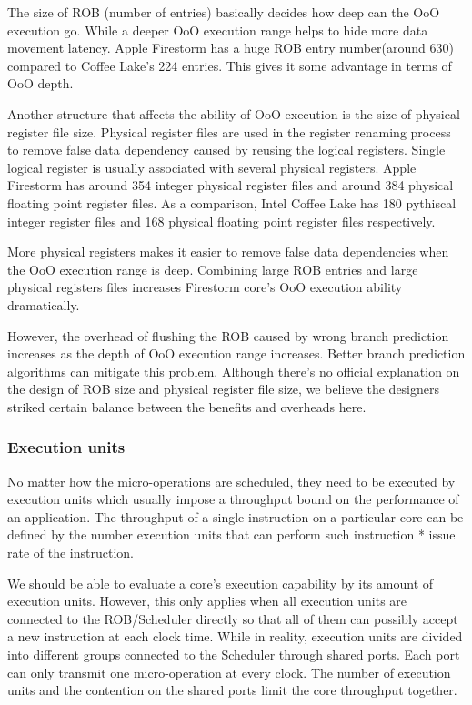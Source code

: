 \documentclass[11pt]{article}
\begin{document}
The size of ROB (number of entries) basically decides how deep can the OoO execution go. While a deeper OoO execution range helps to hide more data movement latency. Apple Firestorm has a huge ROB entry number(around 630) compared to Coffee Lake’s 224 entries. This gives it some advantage in terms of OoO depth.

Another structure that affects the ability of OoO execution is the size of physical register file size. Physical register files are used in the register renaming process to remove false data dependency caused by reusing the logical registers. Single logical register is usually associated with several physical registers. Apple Firestorm has around 354 integer physical register files and around 384 physical floating point register files. As a comparison, Intel Coffee Lake has 180 pythiscal integer register files and 168 physical floating point register files respectively.

More physical registers makes it easier to remove false data dependencies when the OoO execution range is deep. Combining large ROB entries and large physical registers files increases Firestorm core’s OoO execution ability dramatically.

However, the overhead of flushing the ROB caused by wrong branch prediction increases as the depth of OoO execution range increases. Better branch prediction algorithms can mitigate this problem. Although there’s no official explanation on the design of ROB size and physical register file size, we believe the designers striked certain balance between the benefits and overheads here.

\subsubsection*{Execution units}
No matter how the micro-operations are scheduled, they need to be executed by execution units which usually impose a throughput bound on the performance of an application. The throughput of a single instruction on a particular core can be defined by the number execution units that can perform such instruction * issue rate of the instruction.

We should be able to evaluate a core’s execution capability by its amount of execution units. However, this only applies when all execution units are connected to the ROB/Scheduler directly so that all of them can possibly accept a new instruction at each clock time. While in reality, execution units are divided into different groups connected to the Scheduler through shared ports. Each port can only transmit one micro-operation at every clock. The number of execution units and the contention on the shared ports limit the core throughput together. 
\end{document}
